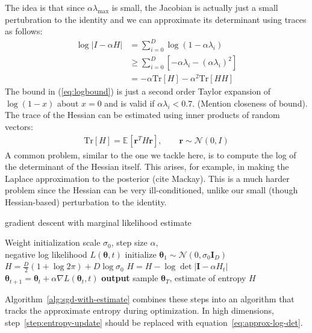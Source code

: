\documentclass[]{article}
\newcommand{\vr}{\mathbf{r}}
\newcommand{\vg}{\mathbf{g}}
\newcommand{\vI}{\mathbf{I}}
\newcommand{\tra}{^{\mathsf{T}}}
\newcommand{\expectargs}[2]{\mathbb{E}_{#1} \left[ {#2} \right]}
\newcommand{\N}[2]{\mathcal{N}\!\left(#1,#2\right)}
\newcommand{\params}{\mathbf{\theta}}
\newcommand{\stepsize}{\alpha}
\newcommand{\gradparams}{\nabla L(\params_t, t)}
\newcommand{\entropy}{H}
\newcommand{\trace}[1]{\text{Tr}\left[#1\right]}
\begin{document}
The idea is that since $\stepsize\lambda_{\text{max}}$ is small, the Jacobian is
actually just a small pertubration to the identity and we can approximate its
determinant using traces as follows:
\begin{align}
\log \left| I - \stepsize H \right|
& =    \sum_{i=0}^D \log\left(1 - \stepsize\lambda_i\right) \nonumber \\
& \geq \sum_{i=0}^D \left[- \stepsize\lambda_i 
                        - (\stepsize\lambda_i)^2 \right] \label{eq:logbound} \\
& = - \stepsize \trace{H} - \stepsize^2 \trace{HH}
\end{align}
The bound in (\ref{eq:logbound}) is just a second order Taylor expansion of
$\log(1 - x)$ about $x = 0$ and is valid if $\stepsize\lambda_i < 0.7$.
(Mention closeness of bound). The trace of the Hessian can be estimated using
inner products of random vectors:
\begin{align}
\trace{H} = \expectargs{}{\vr^TH\vr}, \qquad \vr \sim \N{0}{I}
\label{eq:approx-log-det}
\end{align}
A common problem, similar to the one we tackle here, is to compute the log of
the determinant of the Hessian itself. This arises, for example, in making the
Laplace approximation to the posterior (cite Mackay). This is a much harder
problem since the Hessian can be very ill-conditioned, unlike our small
(though Hessian-based) perturbation to the identity.


\begin{algorithm}[t]
   \caption{gradient descent with marginal likelihood estimate}
   \label{alg:sgd-with-estimate}
\begin{algorithmic}[1]
	Weight initialization scale $\sigma_0$, step size $\stepsize$, \\	
	negative log likelihood $L(\params, t)$	
	\State initialize $\params_1 \sim \N{0}{\sigma_0 \vI_D}$
	\State $\entropy = \frac{D}{2} (1 + \log 2 \pi) + D \log\sigma_0$
		\State $\entropy = \entropy - \log \det | \vI - \stepsize H_t |$   \label{step:entropy-update}
		\State $\params_{t+1} = \params_t + \stepsize \gradparams$  		
   \EndFor
   \State \textbf{output} sample $\params_T$, estimate of entropy $\entropy$
\end{algorithmic}
\end{algorithm}
%
Algorithm~\ref{alg:sgd-with-estimate} combines these steps into an algorithm that tracks the approximate entropy during optimization.
In high dimensions, step~\ref{step:entropy-update} should be replaced with equation~\eqref{eq:approx-log-det}.
\end{document}
